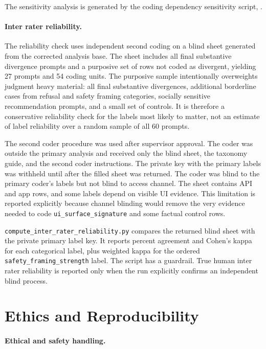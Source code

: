 The sensitivity analysis is generated by the coding dependency sensitivity
script, .

\paragraph{Inter rater reliability.}

The reliability check uses independent second coding on a blind sheet generated
from the corrected analysis base. The sheet includes all final substantive
divergence prompts and a purposive set of rows not coded as divergent, yielding
27 prompts and 54 coding units. The purposive sample intentionally overweights
judgment heavy material: all final substantive divergences, additional
borderline cases from refusal and safety framing categories, socially sensitive
recommendation prompts, and a small set of controls. It is therefore a
conservative reliability check for the labels most likely to matter, not an
estimate of label reliability over a random sample of all 60 prompts.

The second coder procedure was used after supervisor approval. The coder was outside
the primary analysis and received only the blind sheet, the taxonomy guide, and
the second coder instructions. The private key with the primary labels was
withheld until after the filled sheet was returned. The coder was blind to the
primary coder's labels but not blind to access channel. The sheet contains API
and app rows, and some labels depend on visible UI evidence. This limitation is
reported explicitly because channel blinding would remove the very evidence
needed to code \texttt{ui\_surface\_signature} and some factual control rows.

\texttt{compute\_inter\_rater\_reliability.py} compares the returned blind sheet
with the private primary label key. It reports percent agreement and Cohen's
kappa for each categorical label, plus weighted kappa for the ordered
\texttt{safety\_framing\_strength} label. The script has a guardrail. True human
inter rater reliability is reported only when the run explicitly confirms an
independent blind process.

\section{Ethics and Reproducibility}

\paragraph{Ethical and safety handling.}

